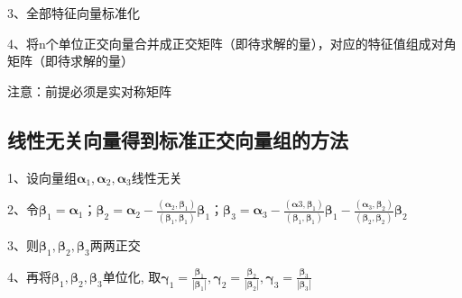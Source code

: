 3、全部特征向量标准化

4、将n个单位正交向量合并成正交矩阵（即待求解的量），对应的特征值组成对角矩阵（即待求解的量）

注意：前提必须是实对称矩阵



\subsection{线性无关向量得到标准正交向量组的方法}

1、设向量组$\boldsymbol{\alpha}_{1}, \boldsymbol{\alpha}_{2}, \boldsymbol{\alpha}_{3}$线性无关

2、令$\boldsymbol{\beta}_{1}=\boldsymbol{\alpha}_{1}$；$\boldsymbol{\beta}_{2}=\boldsymbol{\alpha}_{2}-\frac{\left(\boldsymbol{\alpha}_{2}, \boldsymbol{\beta}_{1}\right)}{\left(\boldsymbol{\beta}_{1}, \boldsymbol{\beta}_{1}\right)} \boldsymbol{\beta}_{1}$；$\boldsymbol{\beta}_{3}=\boldsymbol{\alpha}_{3}-\frac{\left(\boldsymbol{\alpha}{3}, \boldsymbol{\beta}_{1}\right)}{\left(\boldsymbol{\beta}_{1}, \boldsymbol{\beta}_{1}\right)} \boldsymbol{\beta}_{1}-\frac{\left(\boldsymbol{\alpha}_{3}, \boldsymbol{\beta}_{2}\right)}{\left(\boldsymbol{\beta}_{2}, \boldsymbol{\beta}_{2}\right)} \boldsymbol{\beta}_{2}$

3、则$\boldsymbol{\beta}_{1}, \boldsymbol{\beta}_{2}, \boldsymbol{\beta}_{3}$两两正交

4、再将$\boldsymbol{\beta}_{1}, \boldsymbol{\beta}_{2}, \boldsymbol{\beta}_{3}$单位化, 取$\boldsymbol{\gamma}_{1}=\frac{\boldsymbol{\beta}_{1}}{\left|\boldsymbol{\beta}_{1}\right|}, \boldsymbol{\gamma}_{2}=\frac{\boldsymbol{\beta}_{2}}{\left|\boldsymbol{\beta}_{2}\right|}, \boldsymbol{\gamma}_{3}=\frac{\boldsymbol{\beta}_{3}}{\left|\boldsymbol{\beta}_{3}\right|}$



